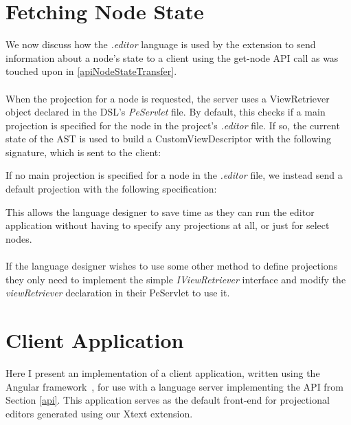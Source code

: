 \documentclass{article}
\begin{document}
{\section{Fetching Node State}\label{viewObject}

We now discuss how the \emph{.editor} language is used by the extension to send information about a node's state to a client using the get-node API call as was touched upon in \ref{apiNodeStateTransfer}. 
\\
\\
When the projection for a node is requested, the server uses a ViewRetriever object declared in the DSL's \emph{PeServlet} file. By default, this checks if a main projection is specified for the node in the project's \emph{.editor} file. If so, the current state of the AST is used to build a CustomViewDescriptor with the following signature, which is sent to the client: 

\vspace*{0.1cm}
If no main projection is specified for a node in the \emph{.editor} file, we instead send a default projection with the following specification: 

This allows the language designer to save time as they can run the editor application without having to specify any projections at all, or just for select nodes. 
\\
\\
If the language designer wishes to use some other method to define projections they only need to implement the simple \emph{IViewRetriever} interface and modify the \emph{viewRetriever} declaration in their PeServlet to use it.


\section{Client Application}\label{clientApp}
Here I present an implementation of a client application, written using the Angular framework~\cite{angular}, for use with a language server implementing the API from Section \ref{api}. This application serves as the default front-end for projectional editors generated using our Xtext extension. 

}
\end{document}

